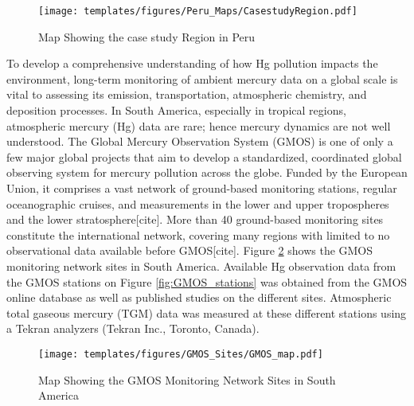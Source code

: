 \begin{figure}[H]
  \texttt{[image: templates/figures/Peru\_Maps/CasestudyRegion.pdf]}
  \centering
  \caption{Map Showing the case study Region in Peru}
  \label{fig:PeruCS}
\end{figure}
\FloatBarrier

\begin{flushleft}
To develop a comprehensive understanding of how Hg pollution impacts the environment, long-term monitoring of ambient mercury data on a global scale is vital to assessing its emission, transportation, atmospheric chemistry, and deposition processes. In South America, especially in tropical regions, atmospheric mercury (Hg) data are rare; hence mercury dynamics are not well understood. The Global Mercury Observation System (GMOS) is one of only a few major global projects that aim to develop a standardized, coordinated global observing system for mercury pollution across the globe. Funded by the European Union, it comprises a vast network of ground-based monitoring stations, regular oceanographic cruises, and measurements in the lower and upper tropospheres and the lower stratosphere[cite]. More than 40 ground-based monitoring sites constitute the international network, covering many regions with limited to no observational data available before GMOS[cite]. Figure \ref{fig:GMOS_stations_map} shows the GMOS monitoring network sites in South America. Available Hg observation data from the GMOS stations on Figure \ref{fig:GMOS_stations} was obtained from the GMOS online database as well as published studies on the different sites. Atmospheric total gaseous mercury (TGM) data was  measured at these different stations using a Tekran analyzers (Tekran Inc., Toronto, Canada). 
\end{flushleft}

\begin{figure}[H]
  \texttt{[image: templates/figures/GMOS\_Sites/GMOS\_map.pdf]}
  \caption{Map Showing the GMOS Monitoring Network Sites in South America}
  \label{fig:GMOS_stations_map}
  \centering
  
\end{figure}
\FloatBarrier

